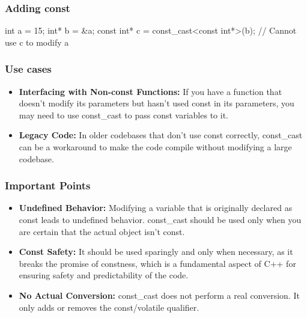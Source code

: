 \documentclass{report}
\begin{document}
    \bigbreak \noindent 
    \subsubsection{Adding const}
    \bigbreak \noindent 
    \begin{cppcode}
    int a = 15;
    int* b = &a;
    const int* c = const_cast<const int*>(b); // Cannot use c to modify a
    \end{cppcode}
    \bigbreak \noindent 

    \bigbreak \noindent 
    \subsubsection{Use cases}
    \begin{itemize}
        \item \textbf{Interfacing with Non-const Functions:} If you have a function that doesn't modify its parameters but hasn't used const in its parameters, you may need to use const\_cast to pass const variables to it.
       \item \textbf{Legacy Code:} In older codebases that don't use const correctly, const\_cast can be a workaround to make the code compile without modifying a large codebase.
    \end{itemize}

    \bigbreak \noindent 
    \subsubsection{Important Points}
    \begin{itemize}
        \item \textbf{Undefined Behavior:} Modifying a variable that is originally declared as const leads to undefined behavior. const\_cast should be used only when you are certain that the actual object isn't const.
        \item \textbf{Const Safety:} It should be used sparingly and only when necessary, as it breaks the promise of constness, which is a fundamental aspect of C++ for ensuring safety and predictability of the code.
        \item \textbf{No Actual Conversion:} const\_cast does not perform a real conversion. It only adds or removes the const/volatile qualifier.
    \end{itemize}
\end{document}
